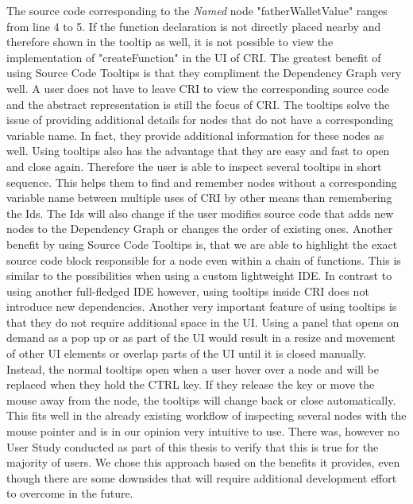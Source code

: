 The source code corresponding to the \emph{Named} node "fatherWalletValue" ranges from line 4 to 5. If the function declaration is not directly placed nearby and therefore shown in the tooltip as well, it is not possible to view the implementation of "createFunction" in the UI of CRI.
The greatest benefit of using Source Code Tooltips is that they compliment the Dependency Graph very well. A user does not have to leave CRI to view the corresponding source code and the abstract representation is still the focus of CRI. The tooltips solve the issue of providing additional details for nodes that do not have a corresponding variable name. In fact, they provide additional information for these nodes as well. Using tooltips also has the advantage that they are easy and fast to open and close again. Therefore the user is able to inspect several tooltips in short sequence. This helps them to find and remember nodes without a corresponding variable name between multiple uses of CRI by other means than remembering the Ids.  The Ids will also change if the user modifies source code that adds new nodes to the Dependency Graph or changes the order of existing ones. Another benefit by using Source Code Tooltips is, that we are able to highlight the exact source code block responsible for a node even within a chain of functions. This is similar to the possibilities when using a  custom lightweight IDE. In contrast to using another full-fledged IDE however, using tooltips inside CRI does not introduce new dependencies. Another very important feature of using tooltips is that they do not require additional space in the UI. Using a panel that opens on demand as a pop up or as part of the UI would result in a resize and movement of other UI elements or overlap parts of the UI until it is closed manually. Instead, the normal tooltips open when a user hover over a node and will be replaced when they hold the CTRL key. If they release the key or move the mouse away from the node, the tooltips will change back or close automatically. This fits well in the already existing workflow of inspecting several nodes with the mouse pointer and is in our opinion very intuitive to use. There was, however no User Study conducted as part of this thesis to verify that this is true for the majority of users. We chose this approach based on the benefits it provides, even though there are some downsides that will require additional development effort to overcome in the future.
			
